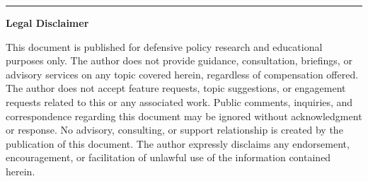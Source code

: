 \documentclass[11pt,letterpaper]{article}
\begin{document}
\vspace{1cm}

\noindent\rule{\textwidth}{0.4pt}

\vspace{0.3cm}

\begin{center}
\small\textbf{Legal Disclaimer}
\end{center}

\vspace{0.2cm}

\noindent\small This document is published for defensive policy research and educational purposes only. The author does not provide guidance, consultation, briefings, or advisory services on any topic covered herein, regardless of compensation offered. The author does not accept feature requests, topic suggestions, or engagement requests related to this or any associated work. Public comments, inquiries, and correspondence regarding this document may be ignored without acknowledgment or response. No advisory, consulting, or support relationship is created by the publication of this document. The author expressly disclaims any endorsement, encouragement, or facilitation of unlawful use of the information contained herein.
\end{document}
